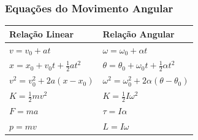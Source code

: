 \subsubsection{Equações do Movimento Angular}
\begin{table}[h!]
    \centering
    \begin{tabular}{|l|l|}
        \hline
    Relação Linear & Relação Angular \\
    \hline
    $v=v_0+at$                & $\omega=\omega_0+\alpha t$           \\
    \hline
    $x=x_0+v_0t+\frac{1}{2}at^2$                 & $\theta=\theta_0+\omega_0t+\frac{1}{2}\alpha t^2$           \\
    \hline
    $v^2=v_0^2+2a(x-x_0)$                 & $\omega^2=\omega^2_0+2\alpha(\theta-\theta_0)$           \\
    \hline
    $K=\frac{1}{2}mv^2$                 & $K=\frac{1}{2}I\omega^2$                  \\
    \hline
    $F=ma$                 & $\tau=I\alpha$             \\
    \hline
    $p=mv$                 & $L=I\omega$                   \\
    \hline
    \end{tabular}
\end{table}